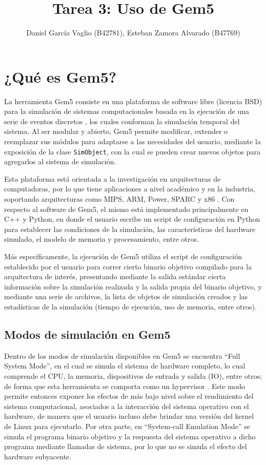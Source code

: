 \documentclass {article}
\begin{document}
\title{Tarea 3: Uso de Gem5}
\author{Daniel García Vaglio (B42781), Esteban Zamora Alvarado (B47769)}

\maketitle

\section{¿Qué es Gem5?}
La herramienta Gem5 consiste en una plataforma de software libre (licencia BSD) para la simulación
de sistemas computacionales basada en la ejecución de una serie de eventos discretos
\cite{binkert2017}, los cuales conforman la simulación temporal del sistema. Al ser modular y
abierto, Gem5 permite modificar, extender o reemplazar sus módulos para adaptarse a las necesidades
del usuario, mediante la exposición de la clase \texttt{SimObject}, con la cual se pueden crear
nuevos objetos para agregarlos al sistema de simulación.

Esta plataforma está orientada a la investigación en arquitecturas de computadoras, por lo que tiene
aplicaciones a nivel académico y en la industria, soportando arquitecturas como MIPS, ARM, Power,
SPARC y x86 \cite{binkert2017}. Con respecto al software de Gem5, el mismo está implementado
principalmente en C++ y Python, en donde el usuario escribe un script de configuración en Python
para establecer las condiciones de la simulación, las características del hardware simulado, el
modelo de memoria y procesamiento, entre otros.

Más específicamente, la ejecución de Gem5 utiliza el script de configuración establecido por el
usuario para correr cierto binario objetivo compilado para la arquitectura de interés, presentando
mediante la salida estándar cierta información sobre la simulación realizada y la salida propia del
binario objetivo, y mediante una serie de archivos, la lista de objetos de simulación creados y las
estadísticas de la simulación (tiempo de ejecución, uso de memoria, entre otros).

\subsection{Modos de simulación en Gem5}
Dentro de los modos de simulación disponibles en Gem5 se encuentra ``Full System Mode'', en el cual
se simula el sistema de hardware completo, lo cual comprende el CPU, la memoria, dispositivos de
entrada y salida (IO), entre otros; de forma que esta herramienta se comporta como un hypervisor
\cite{lowe2017}. Este modo permite entonces exponer los efectos de más bajo nivel sobre el
rendimiento del sistema computacional, asociados a la interacción del sistema operativo con el
hardware, de manera que el usuario incluso debe brindar una versión del kernel de Linux para
ejecutarlo. Por otra parte, en ``System-call Emulation Mode'' se simula el programa binario objetivo
y la respuesta del sistema operativo a dicho programa mediante llamadas de sistema, por lo que no se
simula el efecto del hardware subyacente.
\end{document}
